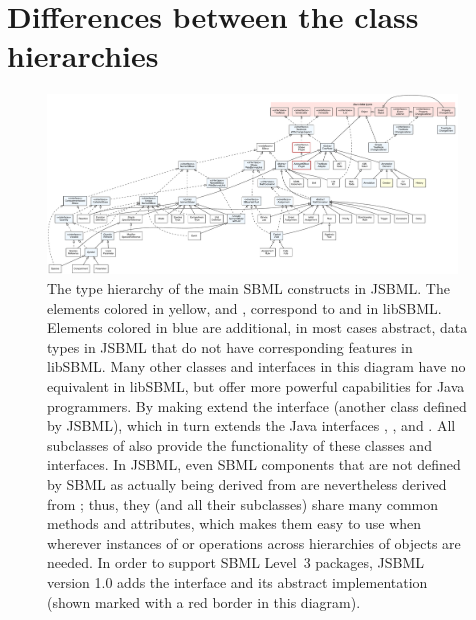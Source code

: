 

\section{Differences between the class hierarchies}
\label{sec:extended-type-hierarchy}

\begin{figure}
  \centering
  \includegraphics[width=0.97\textwidth]{../common/img/FullTypeHierarchy.pdf}
  \caption[The type hierarchy of the main SBML constructs in JSBML]{The
    type hierarchy of the main SBML constructs in JSBML. The elements
    colored in yellow,  and , correspond to
     and  in libSBML. Elements
    colored in blue are additional, in most cases abstract, data types in
    JSBML that do not have corresponding features in libSBML. Many other
    classes and interfaces in this diagram have no equivalent in libSBML,
    but offer more powerful capabilities for Java programmers. By making
    \SBase extend the interface \TreeNodeWithChangeSupport (another class
    defined by JSBML), which in turn extends the Java interfaces
    , , and \TreeNode. All subclasses
    of  also provide the functionality of these classes and
    interfaces. In JSBML, even SBML components that are not defined by
    SBML as actually being derived from  are nevertheless
    derived from \TreeNodeWithChangeSupport; thus, they (and all their
    subclasses) share many common methods and attributes, which makes them
    easy to use when wherever instances of \TreeNode or operations across
    hierarchies of objects are needed. In order to support SBML Level~3
    packages, JSBML version 1.0 adds the interface \SBasePlugin and its
    abstract implementation \AbstractSBasePlugin (shown marked
    with a red border in this diagram).} 
  \label{fig:TypeHierarchy}
\end{figure}

